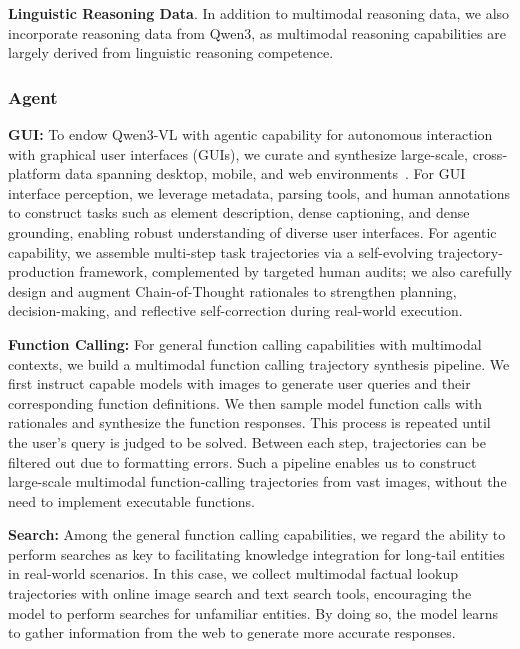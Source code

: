 \documentclass{article} %
\begin{document}
\textbf{Linguistic Reasoning Data}. In addition to multimodal reasoning data, we also incorporate reasoning data from Qwen3, as multimodal reasoning capabilities are largely derived from linguistic reasoning competence.

\subsubsection{Agent}
\textbf{GUI:} 
To endow Qwen3-VL with agentic capability for autonomous interaction with graphical user interfaces (GUIs), we curate and synthesize large-scale, cross-platform data spanning desktop, mobile, and web environments~\citep{ye2025mobile, wang2025opencua, lu2025videoagenttrekcomputerusepretraining}. 
For GUI interface perception, we leverage metadata, parsing tools, and human annotations to construct tasks such as element description, dense captioning, and dense grounding, enabling robust understanding of diverse user interfaces. For agentic capability, we assemble multi-step task trajectories via a self-evolving trajectory-production framework, complemented by targeted human audits; we also carefully design and augment Chain-of-Thought rationales to strengthen planning, decision-making, and reflective self-correction during real-world execution.



\textbf{Function Calling:} For general function calling capabilities with multimodal contexts, we build a multimodal function calling trajectory synthesis pipeline. We first instruct capable models with images to generate user queries and their corresponding function definitions. We then sample model function calls with rationales and synthesize the function responses. This process is repeated until the user's query is judged to be solved. Between each step, trajectories can be filtered out due to formatting errors. Such a pipeline enables us to construct large-scale multimodal function-calling trajectories from vast images, without the need to implement executable functions.

\textbf{Search:} Among the general function calling capabilities, we regard the ability to perform searches as key to facilitating knowledge integration for long-tail entities in real-world scenarios. In this case, we collect multimodal factual lookup trajectories with online image search and text search tools, encouraging the model to perform searches for unfamiliar entities. By doing so, the model learns to gather information from the web to generate more accurate responses.
\end{document}
